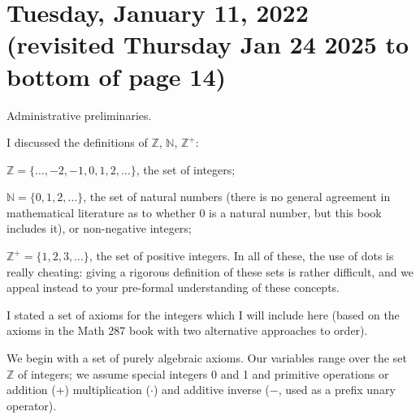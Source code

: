 \documentclass[12pt]{article}
\begin{document}
\newpage


\section{Tuesday, January 11, 2022 (revisited Thursday Jan 24 2025 to bottom of page 14)}

Administrative preliminaries.


I discussed the definitions of ${\mathbb Z}$, ${\mathbb N}$, ${\mathbb Z}^+$: 

${\mathbb Z} = \{\ldots,-2,-1,0,1,2,\ldots\}$, the set of integers;

${\mathbb N}= \{0,1,2,\ldots\}$, the set of natural numbers (there is no general agreement in mathematical literature as to whether 0 is a natural number, but this book includes it), or non-negative integers;

${\mathbb Z}^+ = \{1,2,3,\ldots\}$, the set of positive integers.  In all of these, the use of dots is really cheating:  giving a rigorous definition of these sets is rather difficult, and we appeal instead to your pre-formal understanding of these concepts.

I stated a set of axioms for the integers which I will include here (based on the axioms in the Math 287 book with two alternative approaches to order).

We begin with a set of purely algebraic axioms.  Our variables range over the set $\mathbb Z$ of integers;  we assume special integers 0 and 1 and primitive operations or addition (+) multiplication ($\cdot$) and additive inverse ($-$, used as a prefix unary operator).
\end{document}

